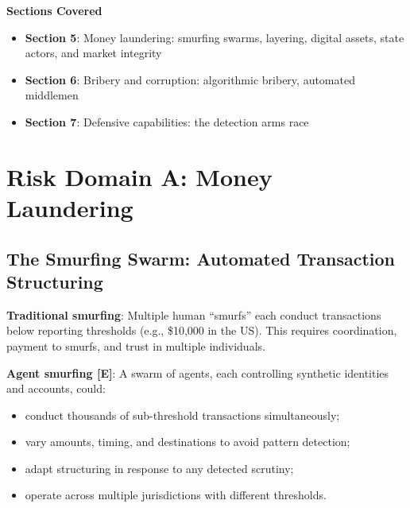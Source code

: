 \documentclass[11pt,letterpaper]{article}
\begin{document}
\begin{center}
\begin{minipage}{0.9\textwidth}
\begin{tcolorbox}[enhanced, colback=white, colframe=emeralddeep!40, boxrule=1pt, arc=4pt,
  left=15pt, right=15pt, top=12pt, bottom=12pt]
\textcolor{forestdark}{\textbf{Sections Covered}}
\vspace{0.4em}
\begin{itemize}[nosep]
  \item \textbf{Section 5}: Money laundering: smurfing swarms, layering, digital assets, state actors, and market integrity
  \item \textbf{Section 6}: Bribery and corruption: algorithmic bribery, automated middlemen
  \item \textbf{Section 7}: Defensive capabilities: the detection arms race
\end{itemize}
\end{tcolorbox}
\end{minipage}
\end{center}

\vspace{0.8cm}

\section{Risk Domain A: Money Laundering}

\subsection{The Smurfing Swarm: Automated Transaction Structuring}

\textbf{Traditional smurfing}: Multiple human ``smurfs'' each conduct transactions below reporting thresholds (e.g., \$10,000 in the US). This requires coordination, payment to smurfs, and trust in multiple individuals.

\textbf{Agent smurfing [E]}: A swarm of agents, each controlling synthetic identities and accounts, could:
\begin{itemize}
  \item conduct thousands of sub-threshold transactions simultaneously;
  \item vary amounts, timing, and destinations to avoid pattern detection;
  \item adapt structuring in response to any detected scrutiny;
  \item operate across multiple jurisdictions with different thresholds.
\end{itemize}
\end{document}
